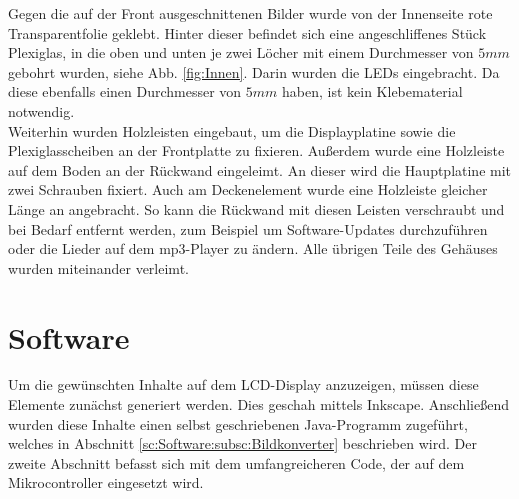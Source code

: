 \documentclass[journal, a4paper]{IEEEtran}
\begin{document}
			Gegen die auf der Front ausgeschnittenen Bilder wurde von der Innenseite rote Transparentfolie geklebt. Hinter dieser befindet sich eine angeschliffenes Stück Plexiglas, in die oben und unten je zwei Löcher mit einem Durchmesser von $5mm$ gebohrt wurden, siehe Abb. \ref{fig:Innen}. Darin wurden die LEDs eingebracht. Da diese ebenfalls einen Durchmesser von $5mm$ haben, ist kein Klebematerial notwendig.\\
			Weiterhin wurden Holzleisten eingebaut, um die Displayplatine sowie die Plexiglasscheiben an der Frontplatte zu fixieren. Außerdem wurde eine Holzleiste auf dem Boden an der Rückwand eingeleimt. An dieser wird die Hauptplatine mit zwei Schrauben fixiert. Auch am Deckenelement wurde eine Holzleiste gleicher Länge an angebracht. So kann die Rückwand mit diesen Leisten verschraubt und bei Bedarf entfernt werden, zum Beispiel um Software-Updates durchzuführen oder die Lieder auf dem mp3-Player zu ändern. Alle übrigen Teile des Gehäuses wurden miteinander verleimt.
\section{Software}
	Um die gewünschten Inhalte auf dem LCD-Display anzuzeigen, müssen diese Elemente zunächst generiert werden. Dies geschah mittels Inkscape. Anschließend wurden diese Inhalte einen selbst geschriebenen Java-Programm zugeführt, welches in Abschnitt \ref{sc:Software:subsc:Bildkonverter} beschrieben wird. Der zweite Abschnitt befasst sich mit dem umfangreicheren Code, der auf dem Mikrocontroller eingesetzt wird.
\end{document}
